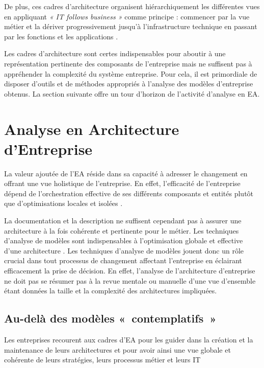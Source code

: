De plus, ces cadres d'architecture organisent hiérarchiquement les différentes vues en
appliquant \emph{« IT follows business »} comme principe : commencer par la
vue métier et la dériver progressivement jusqu'à l'infrastructure
technique en passant par les fonctions et les applications
\cite{winter2006essential}. 

Les cadres d'architecture sont certes indispensables pour aboutir à une représentation pertinente des composants de l'entreprise mais ne suffisent pas à appréhender la complexité du système entreprise. Pour cela, il est primordiale de disposer d'outils et de méthodes appropriés à l'analyse des modèles d'entreprise obtenus. La section suivante offre un tour d'horizon de l'activité d'analyse en EA. 

\section{Analyse en Architecture d'Entreprise}

La valeur ajoutée de l'EA réside dans sa capacité à adresser le changement en
offrant une vue holistique de l'entreprise. En effet, l'efficacité de
l'entreprise dépend de l'orchestration effective de ses différents composants
et entités plutôt que d'optimisations locales et isolées
\cite{nadler1992organizational}. 

La documentation et la description ne suffisent cependant pas à assurer une
architecture à la fois cohérente et pertinente pour le métier. Les techniques
d'analyse de modèles sont indispensables à l'optimisation globale et effective
d'une architecture \cite{lankhorst2013enterprise}. Les techniques d'analyse de
modèles jouent donc un rôle crucial dans tout processus de changement affectant
l'entreprise en éclairant efficacement la prise de décision. En effet,
l'analyse de l'architecture d'entreprise ne doit pas se résumer pas à la revue
mentale ou manuelle d'une vue d'ensemble étant données la taille et la
complexité des architectures impliquées.

\subsection{Au-delà des modèles «~contemplatifs~»}

Les entreprises recourent aux cadres d'EA pour les guider dans la création et
la maintenance de leurs architectures et pour avoir ainsi une vue globale et
cohérente de leurs stratégies, leurs processus métier et leurs IT 

